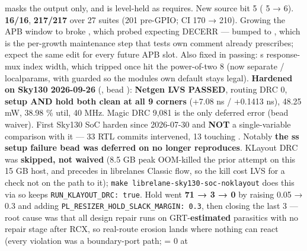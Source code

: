 \begin{record}
\begin{enumerate}
   masks the output only, and  is
  level-held as  requires. New
   source bit 5 ( 5 → 6).
   \textbf{16/16},  \textbf{217/217} over
  27 suites (201 pre-GPIO; CI  170 → 210). Growing the
  APB window to  broke
  , which probed
   expecting DECERR ---  bumped to
  , which is the per-growth maintenance step that
  test\textquotesingle s own comment already prescribes; expect the same
  edit for every future APB slot. Also fixed in passing:
  \textquotesingle s response-mux index width,
  which tripped  once  hit the
  power-of-two 8 (now separate / localparams,
  with  guarded so the module\textquotesingle s own
   default stays legal). \ok{} \textbf{Hardened on
  Sky130 2026-09-26} (, bead ):
  \textbf{Netgen LVS PASSED}, routing DRC 0, \textbf{setup AND hold both
  clean at all 9 corners} (+7.08 ns / +0.1413 ns), 48.25 mW, 38.98 \%
  util, 40 MHz. Magic DRC 9,081 is the only deferred error (bead
   waiver). \warn{} First Sky130 SoC harden since 2026-07-30
  and \textbf{NOT} a single-variable comparison with it --- 33 RTL
  commits intervened, 13 touching . Notably \textbf{the
  ss setup failure bead  was deferred on no longer
  reproduces}. KLayout DRC was \textbf{skipped, not waived} (8.5 GB peak
  OOM-killed the prior attempt on this 15 GB host, and
   precedes  in
  librelane\textquotesingle s Classic flow, so the kill cost LVS for a
  check not on the path to it);
  \texttt{make\ librelane-\allowbreak{}sky130-\allowbreak{}soc-\allowbreak{}noklayout}
  does this via  so  keeps
  \texttt{RUN\_\allowbreak{}KLAYOUT\_\allowbreak{}DRC:\allowbreak{}\ true}.
  Hold went \textbf{71 → 3 → 0} by raising
   0.05 → 0.3 and adding
  \texttt{PL\_\allowbreak{}RESIZER\_\allowbreak{}HOLD\_\allowbreak{}SLACK\_\allowbreak{}MARGIN:\allowbreak{}\ 0.\allowbreak{}3},
  then closing the last 3 --- root cause was that all design repair runs
  on GRT-\textbf{estimated} parasitics with no repair stage after RCX,
  so real-route erosion lands where nothing can react (every violation
  was a boundary-port path;  = 0 at

\end{enumerate}
\end{record}
